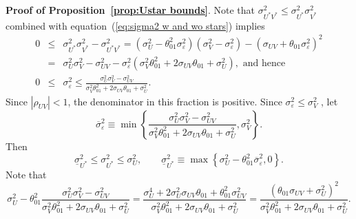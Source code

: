 \documentclass[11pt]{article}
\newcommand\CMDsmall\small %
\begin{document}
\singlespacing\CMDsmall

\noindent \textbf{Proof of Proposition~\ref{prop:Ustar bounds}}$.$ Note that 
$\sigma _{U^{\ast }V^{\ast }}^{2}\leq \sigma _{U^{\ast }}^{2}\sigma
_{V^{\ast }}^{2}$ combined with equation~(\ref{eq:sigma2 w and wo stars})
implies%
\begin{eqnarray*}
0 &\leq &\sigma _{U^{\ast }}^{2}\sigma _{V^{\ast }}^{2}-\sigma _{U^{\ast
}V^{\ast }}^{2}=\left( \sigma _{U}^{2}-\theta _{01}^{2}\sigma _{\varepsilon
}^{2}\right) \left( \sigma _{V}^{2}-\sigma _{\varepsilon }^{2}\right)
-\left( \sigma _{UV}+\theta _{01}\sigma _{\varepsilon }^{2}\right) ^{2}%
{}
\\
&=&\sigma _{U}^{2}\sigma _{V}^{2}-\sigma _{UV}^{2}-\sigma _{\varepsilon
}^{2}\left( \sigma _{V}^{2}\theta _{01}^{2}+2\sigma _{UV}\theta _{01}+\sigma
_{U}^{2}\right) ,\text{ and hence} \\
0 &\leq &\sigma _{\varepsilon }^{2}\leq \frac{\sigma _{U}^{2}\sigma
_{V}^{2}-\sigma _{UV}^{2}}{\sigma _{V}^{2}\theta _{01}^{2}+2\sigma
_{UV}\theta _{01}+\sigma _{U}^{2}}.
\end{eqnarray*}%
Since $\left\vert \rho _{UV}\right\vert <1$, the denominator in this
fraction is positive. Since $\sigma _{\varepsilon }^{2}\leq \sigma _{V}^{2}$%
, let%
\begin{equation*}
\overline{\sigma }_{\varepsilon }^{2}\equiv \min \left\{ \frac{\sigma
_{U}^{2}\sigma _{V}^{2}-\sigma _{UV}^{2}}{\sigma _{V}^{2}\theta
_{01}^{2}+2\sigma _{UV}\theta _{01}+\sigma _{U}^{2}},\sigma _{V}^{2}\right\}
.
\end{equation*}%
Then%
\begin{equation}
\underline{\sigma }_{U^{\ast }}^{2}\leq \sigma _{U^{\ast }}^{2}\leq \sigma
_{U}^{2},\qquad \underline{\sigma }_{U^{\ast }}^{2}\equiv \max \left\{
\sigma _{U}^{2}-\theta _{01}^{2}\overline{\sigma }_{\varepsilon
}^{2},0\right\} .  \label{eq:bound s2Us}
\end{equation}%
Note that%
\begin{equation*}
\sigma _{U}^{2}-\theta _{01}^{2}\frac{\sigma _{U}^{2}\sigma _{V}^{2}-\sigma
_{UV}^{2}}{\sigma _{V}^{2}\theta _{01}^{2}+2\sigma _{UV}\theta _{01}+\sigma
_{U}^{2}}=\frac{\sigma _{U}^{4}+2\sigma _{U}^{2}\sigma _{UV}\theta
_{01}+\theta _{01}^{2}\sigma _{UV}^{2}}{\sigma _{V}^{2}\theta
_{01}^{2}+2\sigma _{UV}\theta _{01}+\sigma _{U}^{2}}=\frac{\left( \theta
_{01}\sigma _{UV}+\sigma _{U}^{2}\right) ^{2}}{\sigma _{V}^{2}\theta
_{01}^{2}+2\sigma _{UV}\theta _{01}+\sigma _{U}^{2}}.
\end{equation*}%
\end{document}
